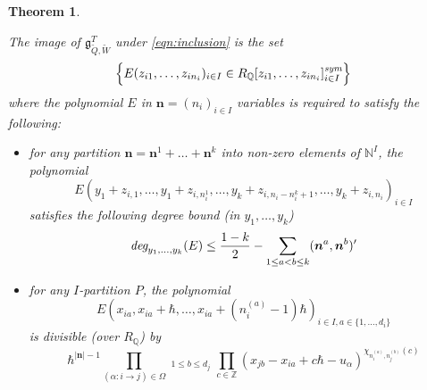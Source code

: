 \documentclass{amsart}
\newtheorem{theorem}{Theorem}[section]
\def\BQ{{\mathbb{Q}}}
\def\BZ{{\mathbb{Z}}}
\def\nn{{\mathbb{N}^I}}
\def\bn{{\boldsymbol{n}}}
\def\edge{\Omega}
\def\ring{R}
\def\tbps{\mathfrak{g}^T_{\tilde{Q},\tilde{W}}}
\begin{document}
\medskip 

\begin{theorem}
\label{thm:bps}

The image of $\tbps$ under \eqref{eqn:inclusion} is the set
$$
\Big\{ E(z_{i1},\dots,z_{in_i})_{i \in I} \in \ring_{\BQ}[z_{i1},\dots,z_{in_i}]^{\emph{sym}}_{i \in I} \Big\}
$$ 
where the polynomial $E$ in $\bn = (n_i)_{i \in I}$ variables is required to satisfy the following:

\medskip 

\begin{itemize}[leftmargin=*]

\item for any partition $\bn = \bn^1 + \dots + \bn^k$ into non-zero elements of $\nn$, the polynomial
\begin{equation}
\label{eqn:add y}
E(y_1+z_{i,1},\dots,y_1+z_{i,n_i^1}, \dots,y_k+z_{i,n_i-n_i^k+1}, \dots, y_k+z_{i,n_i})_{i \in I}
\end{equation}
satisfies the following degree bound (in $y_1,\dots,y_k$)
\begin{equation}
\label{eqn:degree bound}
\emph{deg}_{y_1,\dots,y_k}(E) \leq \frac {1-k}2 - \sum_{1\leq a < b \leq k} (\bn^a,\bn^b)^{\prime}
\end{equation}

\medskip 

\item for any $I$-partition $P$, the polynomial
$$
E \left(x_{ia},x_{ia}+ \hbar,\dots,x_{ia} + (n_i^{(a)}-1)\hbar\right)_{i \in I, a \in \{1,\dots,d_i\}}
$$
is divisible (over $\ring_{\BQ}$) by
\begin{equation}
\label{eqn:factorfullbps}
\hbar^{|\bn|-1} \prod_{(\alpha : i \rightarrow j) \in \edge} \mathop{\prod_{1 \leq a \leq d_i}}_{1 \leq b \leq d_j} \prod_{c \in \BZ} \left(x_{jb}-x_{ia}+c\hbar - u_\alpha\right)^{\chi_{n_i^{(a)},n_j^{(b)}}(c)}
\end{equation}

\end{itemize}

\end{theorem}

\medskip
\end{document}
